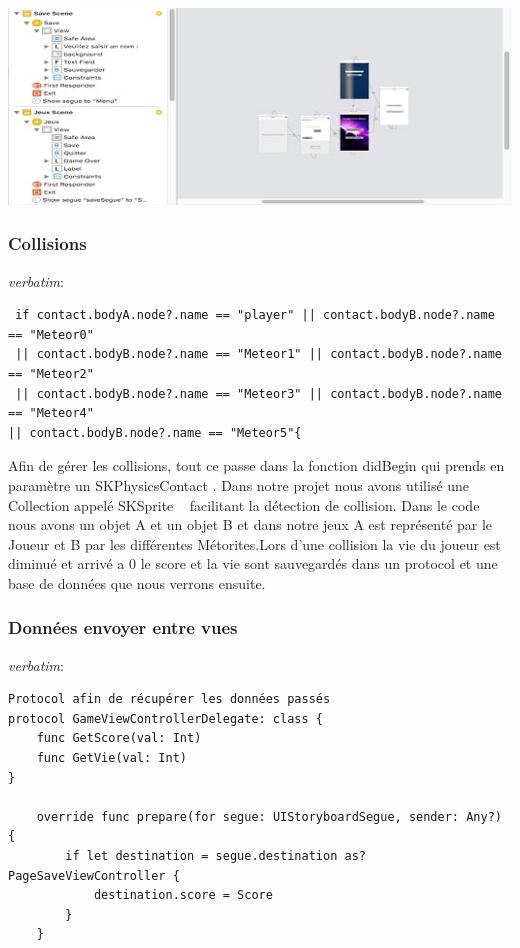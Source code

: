 \documentclass{article}
\begin{document}
\begin{center}
	 \includegraphics[scale=0.8]{storyboard.png}
\end{center}

\subsubsection{Collisions}
\textit{verbatim}:
\begin{verbatim}
 if contact.bodyA.node?.name == "player" || contact.bodyB.node?.name == "Meteor0"
 || contact.bodyB.node?.name == "Meteor1" || contact.bodyB.node?.name == "Meteor2"
 || contact.bodyB.node?.name == "Meteor3" || contact.bodyB.node?.name == "Meteor4" 
|| contact.bodyB.node?.name == "Meteor5"{

\end{verbatim}

Afin de gérer les collisions, tout ce passe dans la fonction  didBegin qui prends en paramètre un SKPhysicsContact . Dans notre projet nous avons utilisé une Collection appelé SKSprite ~\cite{raywenderlich} facilitant la détection de collision. Dans le code nous avons un objet A et un objet B et dans notre jeux A est représenté par le Joueur et B par les différentes Métorites.Lors d'une collision la vie du joueur est diminué et arrivé a 0 le score et la vie sont sauvegardés dans un protocol et une base de données que nous verrons ensuite.

\subsubsection{Données envoyer entre vues}
\textit{verbatim}:
\begin{verbatim}
Protocol afin de récupérer les données passés
protocol GameViewControllerDelegate: class {
    func GetScore(val: Int)
    func GetVie(val: Int)
}

    override func prepare(for segue: UIStoryboardSegue, sender: Any?) {
        if let destination = segue.destination as? PageSaveViewController {
            destination.score = Score
        }
    }
\end{verbatim}
\end{document}
